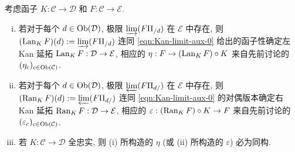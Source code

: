 \begin{theorem}\label{prop:Kan-limit}
	考虑函子 $K: \mathcal{C} \to \mathcal{D}$ 和 $F: \mathcal{C} \to \mathcal{E}$.
	\begin{enumerate}[(i)]
		\item 若对于每个 $d \in \operatorname{Ob}(\mathcal{D})$, 极限 $\varinjlim (F \Pi_{/d})$ 在 $\mathcal{E}$ 中存在, 则 $(\operatorname{Lan}_K F)(d) := \varinjlim (F \Pi_{/d})$ 连同 \eqref{eqn:Kan-limit-aux-0} 给出的函子性确定左 Kan 延拓 $\operatorname{Lan}_K F: \mathcal{D} \to \mathcal{E}$, 相应的 $\eta: F \to (\operatorname{Lan}_K F) \circ K$ 来自先前讨论的 $(\eta_c)_{c \in \operatorname{Ob}(\mathcal{C})}$.
		\item 若对于每个 $d \in \operatorname{Ob}(\mathcal{D})$, 极限 $\varprojlim (F \Pi_{d/})$ 在 $\mathcal{E}$ 中存在, 则 $(\operatorname{Ran}_K F)(d) := \varprojlim (F \Pi_{d/})$ 连同 \eqref{eqn:Kan-limit-aux-0} 的对偶版本确定右 Kan 延拓 $\operatorname{Ran}_K F: \mathcal{D} \to \mathcal{E}$, 相应的 $\varepsilon: (\operatorname{Ran}_K F) \circ K \to F$ 来自先前讨论的 $(\varepsilon_c)_{c \in \operatorname{Ob}(\mathcal{C})}$.
		\item 若 $K: \mathcal{C} \to \mathcal{D}$ 全忠实, 则 (i) 所构造的 $\eta$ (或 (ii) 所构造的 $\varepsilon$) 必为同构.
	\end{enumerate}
\end{theorem}

